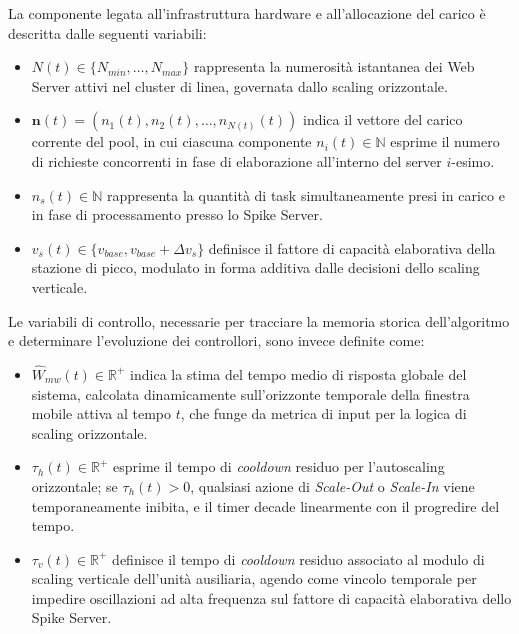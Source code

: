﻿\documentclass[a4paper,12pt]{article}
\begin{document}
La componente legata all'infrastruttura hardware e all'allocazione del carico è descritta dalle seguenti variabili:
\begin{itemize}
    \item $N(t) \in \{N_{min}, \dots, N_{max}\}$ rappresenta la numerosità istantanea dei Web Server attivi nel cluster di linea, governata dallo scaling orizzontale.
    \item $\mathbf{n}(t) = (n_1(t), n_2(t), \dots, n_{N(t)}(t))$ indica il vettore del carico corrente del pool, in cui ciascuna componente $n_i(t) \in \mathbb{N}$ esprime il numero di richieste concorrenti in fase di elaborazione all'interno del server $i$-esimo.
    \item $n_s(t) \in \mathbb{N}$ rappresenta la quantità di task simultaneamente presi in carico e in fase di processamento presso lo Spike Server.
    \item $v_s(t) \in \{v_{base}, v_{base}+\Delta v_s\}$ definisce il fattore di capacità elaborativa della stazione di picco, modulato in forma additiva dalle decisioni dello scaling verticale.
\end{itemize}

Le variabili di controllo, necessarie per tracciare la memoria storica dell'algoritmo e determinare l'evoluzione dei controllori, sono invece definite come:
\begin{itemize}
    \item $\hat{W}_{mw}(t) \in \mathbb{R}^+$ indica la stima del tempo medio di risposta globale del sistema, calcolata dinamicamente sull'orizzonte temporale della finestra mobile attiva al tempo $t$, che funge da metrica di input per la logica di scaling orizzontale.
    \item $\tau_h(t) \in \mathbb{R}^+$ esprime il tempo di \textit{cooldown} residuo per l'autoscaling orizzontale; se $\tau_h(t) > 0$, qualsiasi azione di \textit{Scale-Out} o \textit{Scale-In} viene temporaneamente inibita, e il timer decade linearmente con il progredire del tempo.
    \item $\tau_v(t) \in \mathbb{R}^+$ definisce il tempo di \textit{cooldown} residuo associato al modulo di scaling verticale dell'unità ausiliaria, agendo come vincolo temporale per impedire oscillazioni ad alta frequenza sul fattore di capacità elaborativa dello Spike Server.
\end{itemize}
\end{document}
